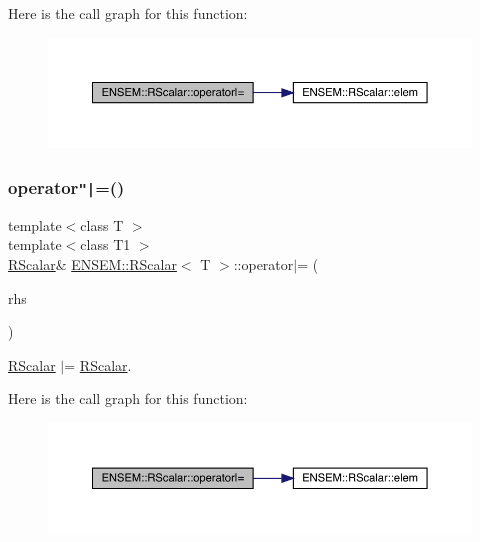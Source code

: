 Here is the call graph for this function\+:
\nopagebreak
\begin{figure}[H]
\begin{center}
\leavevmode
\includegraphics[width=350pt]{d0/d8c/classENSEM_1_1RScalar_ad5838d1c3d7169f6cc7f9b78fe42ac59_cgraph}
\end{center}
\end{figure}
\mbox{\label{classENSEM_1_1RScalar_ad5838d1c3d7169f6cc7f9b78fe42ac59}} 
\subsubsection{\texorpdfstring{operator\texttt{"|}=()}{operator|=()}\hspace{0.1cm}{\footnotesize\ttfamily [3/3]}}
{\footnotesize\ttfamily template$<$class T $>$ \\
template$<$class T1 $>$ \\
\mbox{\hyperlink{classENSEM_1_1RScalar}{R\+Scalar}}\& \mbox{\hyperlink{classENSEM_1_1RScalar}{E\+N\+S\+E\+M\+::\+R\+Scalar}}$<$ T $>$\+::operator$\vert$= (\begin{DoxyParamCaption}\item[{const \mbox{\hyperlink{classENSEM_1_1RScalar}{R\+Scalar}}$<$ T1 $>$ \&}]{rhs }\end{DoxyParamCaption})\hspace{0.3cm}{\ttfamily [inline]}}



\mbox{\hyperlink{classENSEM_1_1RScalar}{R\+Scalar}} $\vert$= \mbox{\hyperlink{classENSEM_1_1RScalar}{R\+Scalar}}. 

Here is the call graph for this function\+:
\nopagebreak
\begin{figure}[H]
\begin{center}
\leavevmode
\includegraphics[width=350pt]{d0/d8c/classENSEM_1_1RScalar_ad5838d1c3d7169f6cc7f9b78fe42ac59_cgraph}
\end{center}
\end{figure}



